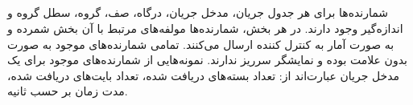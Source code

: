 \subsection{}
شمارنده‌ها برای هر جدول جریان، مدخل جریان، درگاه، صف، گروه، سطل گروه و اندازه‌گیر وجود دارند. در هر بخش، شمارنده‌ها مولفه‌های مرتبط با آن بخش شمرده و به صورت آمار به کنترل کننده ارسال می‌کنند. تمامی شمارنده‌های موجود به صورت بدون علامت بوده و نمایشگر سرریز ندارند. نمونه‌هایی از شمارنده‌های موجود برای یک مدخل جریان عبارت‌اند از: تعداد بسته‌های دریافت شده، تعداد بایت‌‌های دریافت شده، مدت زمان بر حسب ثانیه.



